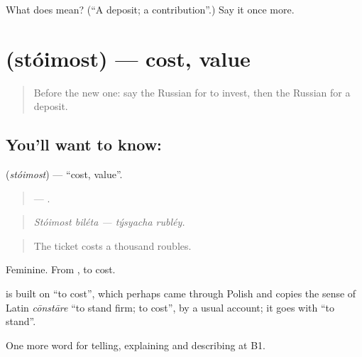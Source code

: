 \begin{tcolorbox}[breakable,colback=teal!4,colframe=teal!35!black,title={Before you move on}]
What does  mean? (\textquotedblleft{}A deposit; a contribution\textquotedblright{}.) Say it once more.
\end{tcolorbox}
\section[\texorpdfstring{\ru{стоимость} (stóimost)}{стоимость (stóimost)}]{ (stóimost) — cost, value}

\label{lesson:RU-C395-stoimost}



\begin{quote}
Before the new one: say the Russian for to invest, then the Russian for a deposit.
\end{quote}

\subsection*{You'll want to know: }
\textbf{} (\emph{stóimost}) — \textquotedblleft{}cost, value\textquotedblright{}.

\begin{quote}
  —  .
\end{quote}

\begin{quote}
\emph{Stóimost biléta — týsyacha rubléy.}
\end{quote}

\begin{quote}
The ticket costs a thousand roubles.
\end{quote}

Feminine. From \emph{}, to cost.

\begin{cousinweb}
\textbf{} is built on \emph{} \textquotedblleft{}to cost\textquotedblright{}, which perhaps came through Polish and copies the sense of Latin \emph{cōnstāre} \textquotedblleft{}to stand firm; to cost\textquotedblright{}, by a usual account; it goes with \emph{} \textquotedblleft{}to stand\textquotedblright{}.
\end{cousinweb}

\begin{grammarlens}[title={What you've built}]
One more word for telling, explaining and describing at B1.
\end{grammarlens}


